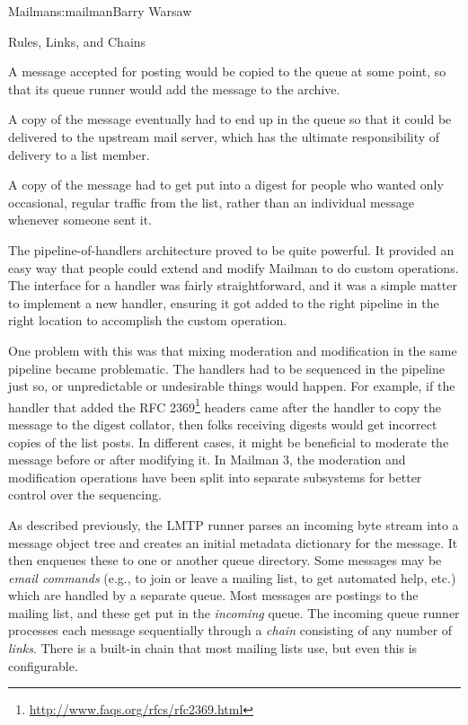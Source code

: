 \begin{aosachapter}{Mailman}{s:mailman}{Barry Warsaw}
\begin{aosasect1}{Rules, Links, and Chains}
\begin{aosaitemize}

\item A message accepted for posting would be copied to the 
  queue at some point, so that its queue runner would add the message
  to the archive.

\item A copy of the message eventually had to end up in the 
  queue so that it could be delivered to the upstream mail server,
  which has the ultimate responsibility of delivery to a list member.

\item A copy of the message had to get put into a digest for people
  who wanted only occasional, regular traffic from the list, rather
  than an individual message whenever someone sent it.

\end{aosaitemize}

The pipeline-of-handlers architecture proved to be quite powerful.  It
provided an easy way that people could extend and modify Mailman to do
custom operations.  The interface for a handler was fairly
straightforward, and it was a simple matter to implement a new
handler, ensuring it got added to the right pipeline in the right
location to accomplish the custom operation.

One problem with this was that mixing moderation and
modification in the same pipeline became problematic.  The handlers
had to be sequenced in the pipeline just so, or unpredictable or
undesirable things would happen.  For example, if the handler that
added the RFC
2369\footnote{\url{http://www.faqs.org/rfcs/rfc2369.html}}
 headers came after the handler to copy the message to
the digest collator, then folks receiving digests would get incorrect
copies of the list posts.  In different cases, it might be beneficial
to moderate the message before or after modifying it.  In Mailman 3,
the moderation and modification operations have been split into
separate subsystems for better control over the sequencing.

As described previously, the LMTP runner parses an incoming byte
stream into a message object tree and creates an initial metadata
dictionary for the message.  It then enqueues these to one or another
queue directory.  Some messages may be \emph{email commands} (e.g., to
join or leave a mailing list, to get automated help, etc.) which are
handled by a separate queue.  Most messages are postings to the
mailing list, and these get put in the \emph{incoming} queue.  The
incoming queue runner processes each message sequentially through a
\emph{chain} consisting of any number of \emph{links}.  There is a
built-in chain that most mailing lists use, but even this is
configurable.


\end{aosasect1}
\end{aosachapter}

